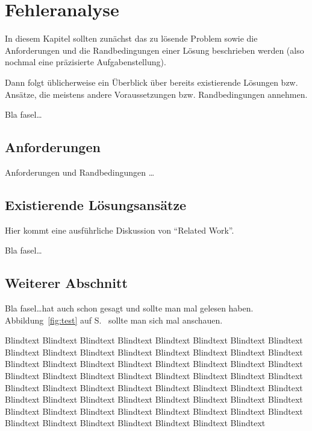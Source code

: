 
\chapter{Fehleranalyse}
\label{ch:Fehleranalyse}
In diesem Kapitel sollten zunächst das zu lösende Problem
sowie die Anforderungen und die Randbedingungen 
einer Lösung beschrieben werden (also nochmal
eine präzisierte Aufgabenstellung).

Dann folgt üblicherweise ein Überblick über bereits existierende
Lösungen bzw. Ansätze, die meistens andere Voraussetzungen bzw.
Randbedingungen annehmen.

Bla fasel\ldots

\section{Anforderungen}
\label{ch:Analyse:sec:Anforderungen}
Anforderungen und Randbedingungen \ldots

\section{Existierende Lösungsansätze}
\label{ch:Analyse:sec:RelatedWork}

Hier kommt eine ausführliche Diskussion
von "`Related Work"'.

Bla fasel\ldots

\section{Weiterer Abschnitt}
\label{ch:Analyse:sec:Abschnitt}

Bla fasel\ldots hat auch schon \cite{TB2000} gesagt und
\cite{TB98,JSAC96,qosr} sollte man mal gelesen haben.
Abbildung~\ref{fig:test} auf S.~\pageref{fig:test} sollte man
sich mal anschauen.

Blindtext Blindtext Blindtext Blindtext Blindtext Blindtext Blindtext
Blindtext Blindtext Blindtext Blindtext Blindtext Blindtext Blindtext
Blindtext Blindtext Blindtext Blindtext Blindtext Blindtext Blindtext
Blindtext Blindtext Blindtext Blindtext Blindtext Blindtext Blindtext
Blindtext Blindtext Blindtext Blindtext Blindtext Blindtext Blindtext
Blindtext Blindtext Blindtext Blindtext Blindtext Blindtext Blindtext
Blindtext Blindtext Blindtext Blindtext Blindtext Blindtext Blindtext
Blindtext Blindtext Blindtext Blindtext Blindtext Blindtext Blindtext
Blindtext Blindtext Blindtext Blindtext Blindtext Blindtext Blindtext

